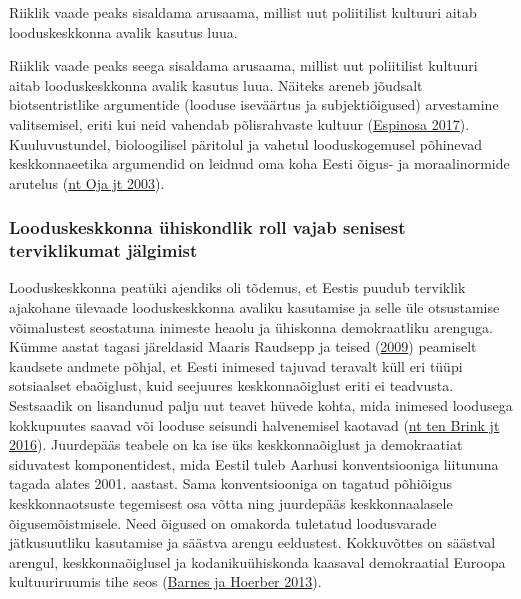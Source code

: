 \documentclass[estonian,]{article}
\begin{document}
\begin{blockquote-right}
Riiklik vaade peaks sisaldama arusaama, millist uut poliitilist kultuuri
aitab looduskeskkonna avalik kasutus luua.
\end{blockquote-right}

Riiklik vaade peaks seega sisaldama arusaama, millist uut poliitilist kultuuri aitab looduskeskkonna avalik kasutus luua. Näiteks areneb jõudsalt biotsentristlike argumentide (looduse iseväärtus ja subjektiõigused) arvestamine valitsemisel, eriti kui neid vahendab põlisrahvaste kultuur (\protect\hyperlink{Espinosa2017}{Espinosa 2017}). Kuuluvustundel, bioloogilisel päritolul ja vahetul looduskogemusel põhinevad keskkonnaeetika argumendid on leidnud oma koha Eesti õigus- ja moraalinormide arutelus (\protect\hyperlink{Oja2003}{nt Oja jt 2003}).

\hypertarget{looduskeskkonna-uxfchiskondlik-roll-vajab-senisest-terviklikumat-juxe4lgimist}{%
\subsubsection*{Looduskeskkonna ühiskondlik roll vajab senisest terviklikumat jälgimist}\label{looduskeskkonna-uxfchiskondlik-roll-vajab-senisest-terviklikumat-juxe4lgimist}}

Looduskeskkonna peatüki ajendiks oli tõdemus, et Eestis puudub terviklik ajakohane ülevaade looduskeskkonna avaliku kasutamise ja selle üle otsustamise võimalustest seostatuna inimeste heaolu ja ühiskonna demokraatliku arenguga. Kümme aastat tagasi järeldasid Maaris Raudsepp ja teised (\protect\hyperlink{Raudsepp2009}{2009}) peamiselt kaudsete andmete põhjal, et Eesti inimesed tajuvad teravalt küll eri tüüpi sotsiaalset ebaõiglust, kuid seejuures keskkonnaõiglust eriti ei teadvusta. Sestsaadik on lisandunud palju uut teavet hüvede kohta, mida inimesed loodusega kokkupuutes saavad või looduse seisundi halvenemisel kaotavad (\protect\hyperlink{Brink2016}{nt ten Brink jt 2016}). Juurdepääs teabele on ka ise üks keskkonnaõiglust ja demokraatiat siduvatest komponentidest, mida Eestil tuleb Aarhusi konventsiooniga liitununa tagada alates 2001. aastast. Sama konventsiooniga on tagatud põhiõigus keskkonnaotsuste tegemisest osa võtta ning juurdepääs keskkonnaalasele õigusemõistmisele. Need õigused on omakorda tuletatud loodusvarade jätkusuutliku kasutamise ja säästva arengu eeldustest. Kokkuvõttes on säästval arengul, keskkonnaõiglusel ja kodanikuühiskonda kaasaval demokraatial Euroopa kultuuriruumis tihe seos (\protect\hyperlink{Barnes2013}{Barnes ja Hoerber 2013}).
\end{document}
